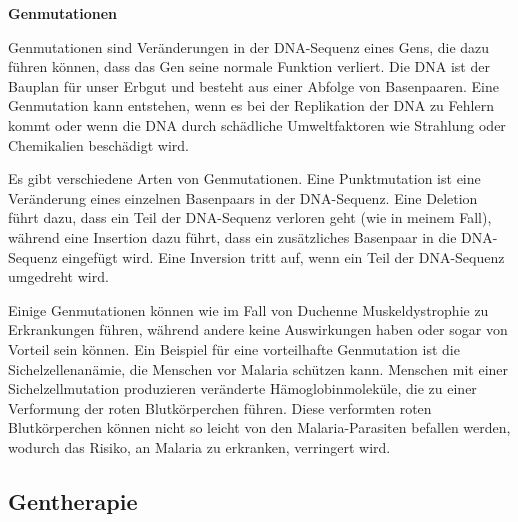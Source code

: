 \documentclass[fontsize=14pt,a4paper,headinclude,DIV=calc,automark]{scrbook}
\begin{document}
\begin{mdframed}[
    linewidth=0.3pt,         %
    linecolor=rahmenlinie,   %
    leftmargin=0, rightmargin=0,
    innertopmargin=12pt, innerbottommargin=12pt,
    innerleftmargin=12pt, innerrightmargin=12pt,
    backgroundcolor=white
]
\small\sffamily
\setlength{\parindent}{0pt} %

\textbf{Genmutationen}

\vspace{0.5\baselineskip}

Genmutationen sind Veränderungen in der DNA-Sequenz eines Gens, die dazu führen können, dass das Gen seine normale Funktion verliert. Die DNA ist der Bauplan für unser Erbgut und besteht aus einer Abfolge von Basenpaaren. Eine Genmutation kann entstehen, wenn es bei der Replikation der DNA zu Fehlern kommt oder wenn die DNA durch schädliche Umweltfaktoren wie Strahlung oder Chemikalien beschädigt wird.

\vspace{0.5\baselineskip}

Es gibt verschiedene Arten von Genmutationen. Eine Punktmutation ist eine Veränderung eines einzelnen Basenpaars in der DNA-Sequenz. Eine Deletion führt dazu, dass ein Teil der DNA-Sequenz verloren geht (wie in meinem Fall), während eine Insertion dazu führt, dass ein zusätzliches Basenpaar in die DNA-Sequenz eingefügt wird. Eine Inversion tritt auf, wenn ein Teil der DNA-Sequenz umgedreht wird.

\vspace{0.5\baselineskip}

Einige Genmutationen können wie im Fall von Duchenne Muskeldystrophie zu Erkrankungen führen, während andere keine Auswirkungen haben oder sogar von Vorteil sein können. Ein Beispiel für eine vorteilhafte Genmutation ist die Sichelzellenanämie, die Menschen vor Malaria schützen kann. Menschen mit einer Sichelzellmutation produzieren veränderte Hämoglobinmoleküle, die zu einer Verformung der roten Blutkörperchen führen. Diese verformten roten Blutkörperchen können nicht so leicht von den Malaria-Parasiten befallen werden, wodurch das Risiko, an Malaria zu erkranken, verringert wird.

\end{mdframed}


\subsection{Gentherapie}
\label{sec:therapien}
\end{document}
